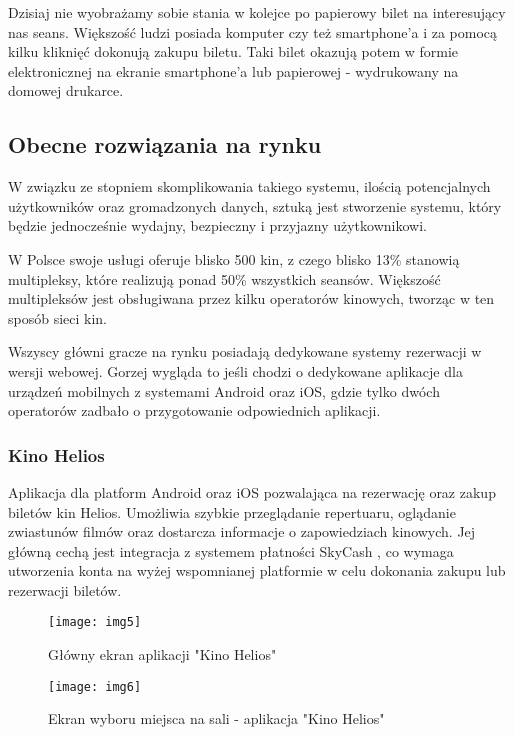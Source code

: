 Dzisiaj nie wyobrażamy sobie stania w kolejce po papierowy bilet na interesujący nas seans. Większość ludzi posiada komputer czy też smartphone'a i za pomocą kilku kliknięć dokonują zakupu biletu. Taki bilet okazują potem w formie elektronicznej na ekranie smartphone'a lub papierowej - wydrukowany na domowej drukarce.

\subsection*{Obecne rozwiązania na rynku}
W związku ze stopniem skomplikowania takiego systemu, ilością potencjalnych użytkowników oraz gromadzonych danych, sztuką jest stworzenie systemu, który będzie jednocześnie wydajny, bezpieczny i przyjazny użytkownikowi. 

W Polsce swoje usługi oferuje blisko 500 kin, z czego blisko 13\% stanowią multipleksy, które realizują ponad 50\% wszystkich seansów. Większość multipleksów jest obsługiwana przez kilku operatorów kinowych, tworząc w ten sposób sieci kin.\cite{Cinema:1}

Wszyscy główni gracze na rynku posiadają dedykowane systemy rezerwacji w wersji webowej. Gorzej wygląda to jeśli chodzi o dedykowane aplikacje dla urządzeń mobilnych z systemami Android oraz iOS, gdzie tylko dwóch operatorów zadbało o przygotowanie odpowiednich aplikacji.

\subsubsection*{Kino Helios}
Aplikacja dla platform Android oraz iOS  pozwalająca na rezerwację oraz zakup biletów kin Helios. Umożliwia szybkie przeglądanie repertuaru, oglądanie zwiastunów filmów oraz dostarcza informacje o zapowiedziach kinowych. Jej główną cechą jest integracja z systemem płatności SkyCash \cite{Skycash:online}, co wymaga utworzenia konta na wyżej wspomnianej platformie w celu dokonania zakupu lub rezerwacji biletów. 

\begin{figure}[h]
\centering
\texttt{[image: img5]}
\caption{Główny ekran aplikacji "Kino Helios"}
\end{figure}

\begin{figure}[h]
\centering
\texttt{[image: img6]}
\caption{Ekran wyboru miejsca na sali - aplikacja "Kino Helios"}
\end{figure}

